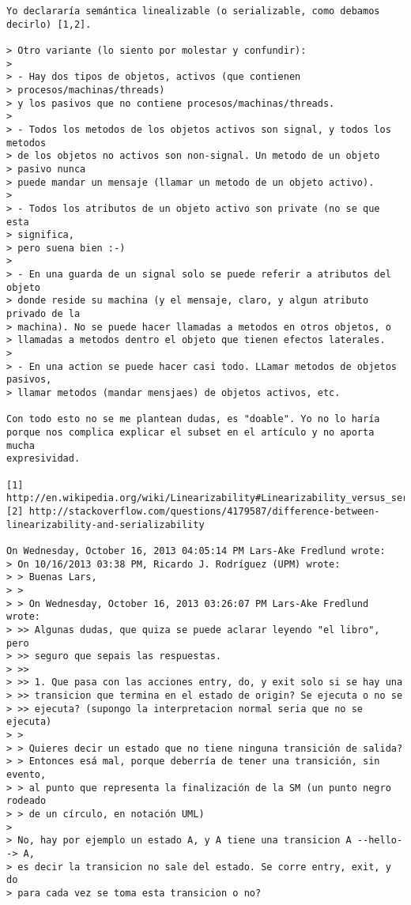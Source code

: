 \begin{verbatim}
Yo declararía semántica linealizable (o serializable, como debamos
decirlo) [1,2].

> Otro variante (lo siento por molestar y confundir):
>
> - Hay dos tipos de objetos, activos (que contienen
> procesos/machinas/threads)
> y los pasivos que no contiene procesos/machinas/threads.
>
> - Todos los metodos de los objetos activos son signal, y todos los metodos
> de los objetos no activos son non-signal. Un metodo de un objeto
> pasivo nunca
> puede mandar un mensaje (llamar un metodo de un objeto activo).
>
> - Todos los atributos de un objeto activo son private (no se que esta
> significa,
> pero suena bien :-)
>
> - En una guarda de un signal solo se puede referir a atributos del objeto
> donde reside su machina (y el mensaje, claro, y algun atributo privado de la
> machina). No se puede hacer llamadas a metodos en otros objetos, o
> llamadas a metodos dentro el objeto que tienen efectos laterales.
>
> - En una action se puede hacer casi todo. LLamar metodos de objetos pasivos,
> llamar metodos (mandar mensjaes) de objetos activos, etc.

Con todo esto no se me plantean dudas, es "doable". Yo no lo haría
porque nos complica explicar el subset en el artículo y no aporta mucha
expresividad.

[1] http://en.wikipedia.org/wiki/Linearizability#Linearizability_versus_serializability
[2] http://stackoverflow.com/questions/4179587/difference-between-linearizability-and-serializability

On Wednesday, October 16, 2013 04:05:14 PM Lars-Ake Fredlund wrote:
> On 10/16/2013 03:38 PM, Ricardo J. Rodríguez (UPM) wrote:
> > Buenas Lars,
> > 
> > On Wednesday, October 16, 2013 03:26:07 PM Lars-Ake Fredlund wrote:
> >> Algunas dudas, que quiza se puede aclarar leyendo "el libro", pero
> >> seguro que sepais las respuestas.
> >> 
> >> 1. Que pasa con las acciones entry, do, y exit solo si se hay una
> >> transicion que termina en el estado de origin? Se ejecuta o no se
> >> ejecuta? (supongo la interpretacion normal seria que no se ejecuta)
> > 
> > Quieres decir un estado que no tiene ninguna transición de salida?
> > Entonces esá mal, porque deberría de tener una transición, sin evento,
> > al punto que representa la finalización de la SM (un punto negro rodeado
> > de un círculo, en notación UML)
> 
> No, hay por ejemplo un estado A, y A tiene una transicion A --hello--> A,
> es decir la transicion no sale del estado. Se corre entry, exit, y do
> para cada vez se toma esta transicion o no?


\end{verbatim}
